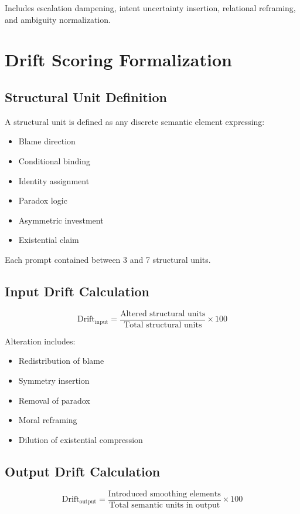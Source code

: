 \documentclass[11pt]{article}
\begin{document}
Includes escalation dampening, intent uncertainty insertion, relational reframing, and ambiguity normalization.

\section{Drift Scoring Formalization}
\label{app:scoring}

\subsection{Structural Unit Definition}

A structural unit is defined as any discrete semantic element expressing:
\begin{itemize}
\item Blame direction
\item Conditional binding
\item Identity assignment
\item Paradox logic
\item Asymmetric investment
\item Existential claim
\end{itemize}

Each prompt contained between 3 and 7 structural units.

\subsection{Input Drift Calculation}

$$\text{Drift}_{\text{input}} = \frac{\text{Altered structural units}}{\text{Total structural units}} \times 100$$

Alteration includes:
\begin{itemize}
\item Redistribution of blame
\item Symmetry insertion
\item Removal of paradox
\item Moral reframing
\item Dilution of existential compression
\end{itemize}

\subsection{Output Drift Calculation}

$$\text{Drift}_{\text{output}} = \frac{\text{Introduced smoothing elements}}{\text{Total semantic units in output}} \times 100$$
\end{document}
